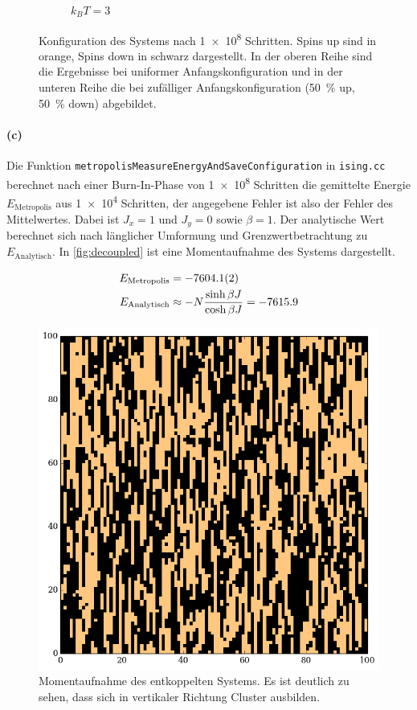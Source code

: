 \documentclass{scrartcl}
\begin{document}
\begin{figure}[H]
\begin{subfigure}{.32\textwidth}
        \caption{$k_BT = 3$}
    \end{subfigure}
    \caption{Konfiguration des Systems nach \num{1e8} Schritten. Spins up sind in orange, Spins down in schwarz dargestellt. In der oberen Reihe sind die Ergebnisse bei uniformer Anfangskonfiguration und in der unteren Reihe die bei zufälliger Anfangskonfiguration (\SI{50}{\percent} up, \SI{50}{\percent} down) abgebildet.}
    \label{fig:conf}
\end{figure}

\paragraph{(c)} Die Funktion \texttt{metropolisMeasureEnergyAndSaveConfiguration} in \texttt{ising.cc} berechnet nach einer Burn-In-Phase von \num{1e8} Schritten die gemittelte Energie $E_{\text{Metropolis}}$ aus \num{1e4} Schritten, der angegebene Fehler ist also der Fehler des Mittelwertes. Dabei ist $J_x = 1$ und $J_y = 0$ sowie $\beta = 1$. Der analytische Wert berechnet sich nach länglicher Umformung und Grenzwertbetrachtung zu $E_{\text{Analytisch}}$. In \autoref{fig:decoupled} ist eine Momentaufnahme des Systems dargestellt.

\begin{align*}
    E_{\text{Metropolis}} &= \num{-7604.1 \pm 0.2} \\
    E_{\text{Analytisch}} &\approx -N\frac{\sinh\beta J}{\cosh\beta J} = \num{-7615.9} \\
\end{align*}

\begin{figure}[H]
    \centering
    \includegraphics[width=.5\textwidth]{plots/decoupled.png}
    \caption{Momentaufnahme des entkoppelten Systems. Es ist deutlich zu sehen, dass sich in vertikaler Richtung Cluster ausbilden.}
    \label{fig:decoupled}
\end{figure}
\end{document}
